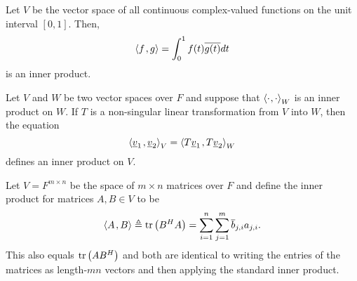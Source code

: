 \begin{example}
Let $V$ be the vector space of all continuous complex-valued functions on the unit interval $[0,1]$.
Then,
\begin{equation*}
{\left\langle  f  \mskip2mu ,  g  \right\rangle}
= \int_0^1 f(t) \overline{g(t)} dt
\end{equation*}
is an inner product.
\end{example}

\begin{example}
Let $V$ and $W$ be two vector spaces over $F$ and suppose that ${\langle  \cdot  \mskip1mu ,  \cdot  \rangle}_W$ is an inner product on $W$.
If $T$ is a non-singular linear transformation from $V$ into $W$, then the equation
\begin{equation*}
{\left\langle  \underline{v}_1  \mskip2mu ,  \underline{v}_2  \right\rangle}_V
= {\left\langle  T \underline{v}_1  \mskip2mu ,  T \underline{v}_2  \right\rangle}_W
\end{equation*}
defines an inner product on $V$.
\end{example}

\begin{example}
Let $V=F^{m\times n}$ be the space of $m\times n$ matrices over $F$ and define the inner product for matrices $A,B \in V$ to be
\begin{equation*}
{\left\langle  A  \mskip2mu ,  B  \right\rangle} \triangleq \mathrm{tr} \left(B^H A \right) = \sum_{i=1}^n \sum_{j=1}^m \overline{b}_{j,i} a_{j,i}.
\end{equation*}
This also equals $\mathrm{tr} \left(A B^H\right)$ and both are identical to writing the entries of the matrices as length-$mn$ vectors and then applying the standard inner product.
\end{example}

